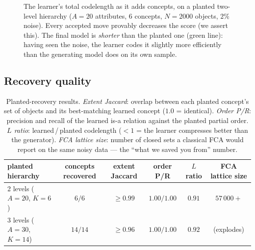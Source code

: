 \documentclass[11pt]{article}
\newcommand{\CL}{L}                       %
\begin{document}
\begin{figure}[h]
\centering
{}
\caption{The learner's total codelength as it adds concepts, on a planted
two-level hierarchy ($A=20$ attributes, $6$ concepts, $N=2000$ objects,
$2\%$ noise). Every accepted move provably decreases the score (we assert
this). The final model is \emph{shorter} than the planted one (green line):
having seen the noise, the learner codes it slightly more efficiently than the
generating model does on its own sample.}
\label{fig:traj}
\end{figure}

\subsection{Recovery quality}

\begin{table}[h]
\centering
\begin{tabular}{lccccc}
\toprule
planted hierarchy & concepts recovered & extent Jaccard & order P/R & $\CL$ ratio & FCA lattice size \\
\midrule
2 levels ($A{=}20$, $K{=}6$)  & $6/6$   & $\ge 0.99$ & $1.00/1.00$ & $0.91$ & $57\,000+$ \\
3 levels ($A{=}30$, $K{=}14$) & $14/14$ & $\ge 0.96$ & $1.00/1.00$ & $0.92$ & (explodes) \\
\bottomrule
\end{tabular}
\caption{Planted-recovery results. \emph{Extent Jaccard}: overlap between each
planted concept's set of objects and its best-matching learned concept
($1.0$ = identical). \emph{Order P/R}: precision and recall of the learned
is-a relation against the planted partial order. \emph{$\CL$ ratio}:
learned\,/\,planted codelength ($<1$ = the learner compresses better than the
generator). \emph{FCA lattice size}: number of closed sets a classical FCA would
report on the same noisy data --- the ``what we saved you from'' number.}
\label{tab:recovery}
\end{table}
\end{document}
